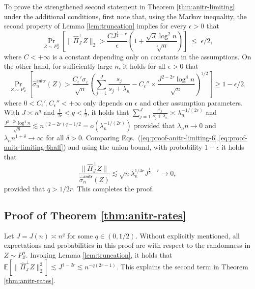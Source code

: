 \documentclass[aos]{imsart}
\renewcommand{\hat}{\widehat}
\newcommand{\anitr}{\mathsf{anitr}}
\theoremstyle{plain}
\theoremstyle{definition}
\theoremstyle{definition}
\begin{document}
\begin{appendix}
To prove the strengthened second statement in Theorem \ref{thm:anitr-limiting} under the additional conditions, first note that, using the Markov inequality, the second property of Lemma \ref{lem:truncation} implies
for every $\epsilon>0$ that 
\begin{equation}
\Pr_{Z\sim P_Z^n}\left[\|\hat\Pi_J^\perp Z\|_2 > \frac{CJ^{\frac{1}{2}-r}}{\epsilon}\left(1+\frac{\sqrt{J}\log^2 n}{\sqrt[4]{n}}\right)\right] \;\leq\; \epsilon/2,
\label{eq:proof-anitr-limiting-6}
\end{equation}
where $C<+\infty$ is a constant depending only on constants in the assumptions.
{\color{orange}
On the other hand, for sufficiently large $n$, it holds for all $\epsilon>0$ that
\begin{equation}
\Pr_{Z\sim P_Z^n}\left[\hat\sigma_n^\anitr(Z) > \frac{C_\epsilon'\sigma_\varepsilon}{\sqrt{n}}\left(\sum_{j=1}^J \frac{s_j}{s_j+\lambda_n} - C_\epsilon''\times \frac{J^{2-2r}\log^4 n}{\sqrt{n}}\right)^{1/2}\right]\geq 1-\epsilon/2,
\label{eq:proof-anitr-limiting-6half}
\end{equation}
where $0<C_\epsilon',C_\epsilon''<+\infty$ only depends on $\epsilon$ and other assumption parameters.
With $J\asymp n^q$ and $\frac{1}{2r}<q<\frac{1}{2}$, it holds that $\sum_{j=1}^J \frac{s_j}{s_j+\lambda_n}\asymp \lambda_n^{-1/(2r)}$ and $\frac{J^{2-2r}\log^4n}{\sqrt{n}} \lesssim n^{(2-2r)q-1/2} = o(\lambda_n^{-1/(2r)})$
provided that $\lambda_n n \to 0$ and $\lambda_n n^{1+\delta}\to\infty$ for all $\delta>0$. 
Comparing Eqs.~(\ref{eq:proof-anitr-limiting-6},\ref{eq:proof-anitr-limiting-6half}) and using the union bound, with probability $1-\epsilon$ it holds that
$$
\frac{\|\hat\Pi_J^\perp Z\|}{\hat\sigma_n^\anitr(Z)} \lesssim \sqrt{n}\lambda_n^{1/4r} J^{\frac{1}{2}-r} \to 0, 
$$
}
provided that $q>1/2r$. This completes the proof.


\subsection{Proof of Theorem \ref{thm:anitr-rates}}
Let $J=J(n)\asymp n^q$ for some $q\in(0,1/2)$.
Without explicitly mentioned, all expectations and probabilities in this proof are with respect to the randomness in $Z\sim P_Z^n$.
Invoking Lemma \ref{lem:truncation}, it holds that $\mathbb E[\|\hat\Pi_J^\perp Z\|_2^2]\lesssim J^{1-2r} \lesssim n^{-q(2r-1)}$. This explains the second term in Theorem \ref{thm:anitr-rates}.


\end{appendix}
\end{document}
